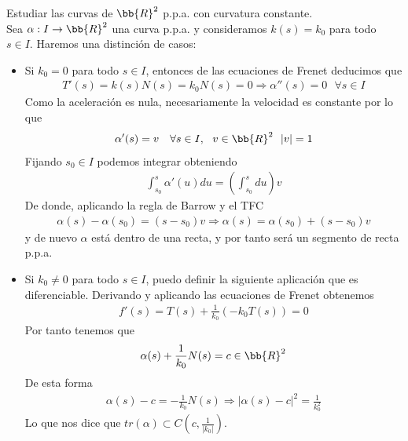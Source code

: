 \begin{ejercicio}
    Estudiar las curvas de $\bb{R}^2$ p.p.a. con curvatura constante.\\

    Sea $\alpha:I\to \bb{R}^2$ una curva p.p.a. y consideramos $k(s)=k_0$ para todo $s\in I$. Haremos una distinción de casos:
    \begin{itemize}
        \item Si $k_0=0$ para todo $s\in I$, entonces de las ecuaciones de Frenet deducimos que 
        \begin{gather*}
            T'(s) = k(s)N(s) = k_0N(s)=0 \Rightarrow \alpha''(s)=0 \ \ \ \forall s \in I
        \end{gather*}
        Como la aceleración es nula, necesariamente la velocidad es constante por lo que 
        \begin{gather*}
            \alpha'(s) = v \ \ \ \forall s \in I,\ \ v\in \bb{R}^2\ \ |v|=1
        \end{gather*}
        Fijando $s_0\in I$ podemos integrar obteniendo
        \begin{gather*}
            \int_{s_0}^s \alpha'(u)du= \left(\int_{s_0}^sdu\right)v
        \end{gather*}
        De donde, aplicando la regla de Barrow y el TFC
        \begin{gather*}
            \alpha(s) - \alpha(s_0) = (s-s_0)v \Rightarrow \alpha(s)=\alpha(s_0) + (s-s_0)v
        \end{gather*}
        y de nuevo $\alpha$ está dentro de una recta, y por tanto será un segmento de recta p.p.a.

        \item Si $k_0\neq 0$ para todo $s\in I$, puedo definir la siguiente aplicación
        que es diferenciable. Derivando y aplicando las ecuaciones de Frenet obtenemos 
        \begin{gather*}
            f'(s) = T(s) + \frac{1}{k_0}(-k_0T(s)) = 0
        \end{gather*}
        Por tanto tenemos que 
        \begin{gather*}
            \alpha(s) + \frac{1}{k_0}N(s) = c\in \bb{R}^2
        \end{gather*}
        De esta forma 
        \begin{gather*}
            \alpha(s) - c = -\frac{1}{k_0}N(s) \Rightarrow |\alpha(s)-c|^2 = \frac{1}{k_0^2}
        \end{gather*}
        Lo que nos dice que $tr(\alpha)\subset C(c, \frac{1}{|k_0|})$.
    \end{itemize}
\end{ejercicio}

